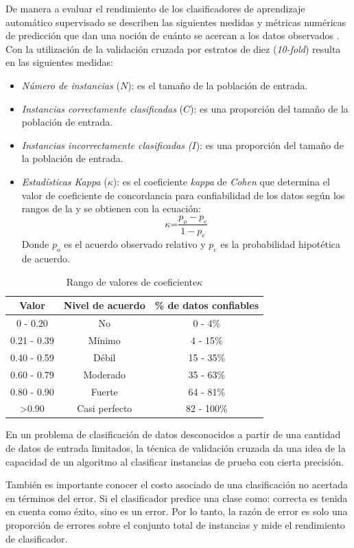 \label{ssec6:metricas}De manera a evaluar el rendimiento de los clasificadores
de aprendizaje automático supervisado se describen las siguientes
medidas y métricas numéricas de predicción que dan una noción de cuánto
se acercan a los datos observados \cite{Witten2017}. Con la utilización
de la validación cruzada por estratos de diez (\emph{10-fold}) resulta
en las siguientes medidas:
\begin{itemize}
\item \emph{Número de instancias} ($N$): es el tamaño de la población de
entrada.
\item \emph{Instancias correctamente clasificadas} ($C$): es una proporción
del tamaño de la población de entrada.
\item \emph{Instancias incorrectamente clasificadas} \emph{(}$I$): es una
proporción del tamaño de la población de entrada.
\item \emph{Estadísticas Kappa} ($\kappa$): es el coeficiente \emph{kappa}
de \emph{Cohen} que determina el valor de coeficiente de concordancia
para confiabilidad de los datos según los rangos de la 
y se obtienen con la ecuación: 
\[
\kappa\text{=}\frac{p_{o}-p_{e}}{1-p_{e}}
\]
Donde $p_{o}$ es el acuerdo observado relativo y $p_{e}$ es la probabilidad
hipotética de acuerdo.
\end{itemize}
\begin{table}[h]
\begin{centering}
\begin{tabular}{|c|c|c|}
\hline 
Valor & Nivel de acuerdo & \% de datos confiables\tabularnewline
\hline 
\hline 
0 - 0.20 & No & 0 - 4\%\tabularnewline
\hline 
0.21 - 0.39 & Mínimo & 4 - 15\%\tabularnewline
\hline 
0.40 - 0.59 & Débil & 15 - 35\%\tabularnewline
\hline 
0.60 - 0.79 & Moderado & 35 - 63\%\tabularnewline
\hline 
0.80 - 0.90 & Fuerte & 64 - 81\%\tabularnewline
\hline 
>0.90 & Casi perfecto & 82 - 100\%\tabularnewline
\hline 
\end{tabular}
\par\end{centering}
\caption{\label{tab6:kappa-coef}Rango de valores de coeficiente$\kappa$}
\end{table}

En un problema de clasificación de datos desconocidos a partir de
una cantidad de datos de entrada limitados, la técnica de validación
cruzada da una idea de la capacidad de un algoritmo al clasificar
instancias de prueba con cierta precisión. 

También es importante conocer el costo asociado de una clasificación
no acertada en términos del error. Si el clasificador predice una
clase como: correcta es tenida en cuenta como éxito, sino es un error.
Por lo tanto, la razón de error es solo una proporción de errores
sobre el conjunto total de instancias y mide el rendimiento de clasificador. 

